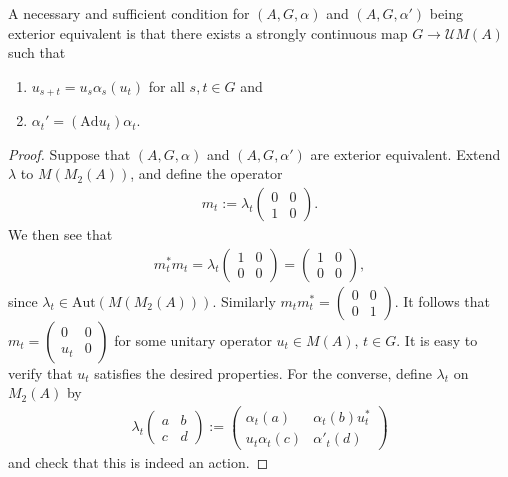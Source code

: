 \begin{lemma}
	A necessary and sufficient condition for $(A, G , \alpha)$ and $(A, G , \alpha')$ being exterior equivalent is that there exists a strongly continuous map $G \to \mathcal{U} M(A)$ such that
	\begin{enumerate}
		\item $u_{s+t}=u_s\alpha_s(u_t)$ for all $s,t \in G$ and\\
		\item $\alpha_t' = (\mathrm{Ad} u_t ) \alpha_t$.
	\end{enumerate}
\end{lemma}
\begin{proof}
Suppose that $(A, G , \alpha)$ and $(A,G,\alpha')$ are exterior equivalent. Extend $\lambda$ to $M(M_2(A))$, and define the operator
\begin{align*}
	m_t:=\lambda_t\begin{pmatrix}
		0 & 0 \\
		1 & 0
	\end{pmatrix}.
\end{align*}
We then see that 
\begin{align*}
	m_t^* m_t = \lambda_{t} \begin{pmatrix}
		1 & 0 \\
		0 & 0 
	\end{pmatrix} =  \begin{pmatrix}
		1 & 0 \\
		0 & 0
	\end{pmatrix},
\end{align*}
since $\lambda_t \in \mathrm{Aut}(M(M_2(A)))$. Similarly $m_tm_t^* = \begin{pmatrix}
	0 & 0\\
	0 & 1
\end{pmatrix}$. It follows that $m_t = \begin{pmatrix}
	0 & 0 \\
	u_t & 0
\end{pmatrix}$
for some unitary operator $u_t \in M(A)$, $t \in G$. It is easy to verify that $u_t$ satisfies the desired properties. For the converse, define $\lambda_t$ on $M_2(A)$ by
\begin{align*}
	\lambda_t \begin{pmatrix}
		a & b \\
		c & d
	\end{pmatrix}:=
	\begin{pmatrix}
		\alpha_t(a) & \alpha_t(b) u_t^*\\
		u_t \alpha_t(c) & \alpha'_t(d)
	\end{pmatrix}
\end{align*}
and check that this is indeed an action.
\end{proof}
